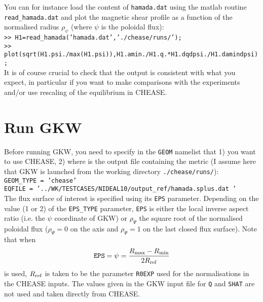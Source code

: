 \documentclass[a4paper,12pt]{article}
\newcommand{\ind}[1]{\ensuremath{_{\rm{#1}}}}
\begin{document}
You can for instance load the content of \texttt{hamada.dat} using the matlab routine \texttt{read\_hamada.dat} and plot the magnetic shear profile as a function of the normalised radius $\rho_\psi$ (where $\psi$ is the poloidal flux):\\
\texttt{\small >> H1=read\_hamada('hamada.dat','./chease/runs/');}\\
\texttt{\small >> plot(sqrt(H1.psi./max(H1.psi)),H1.amin./H1.q.*H1.dqdpsi./H1.damindpsi);}\\
It is of course crucial to check that the output is consistent with what you expect, in particular if you want to make comparisons with the experiments and/or use rescaling of the equilibrium in CHEASE.


\section{Run GKW}
Before running GKW, you need to specify in the \texttt{GEOM} namelist that 1) you want to use CHEASE, 2) where is the output file containing the metric (I assume here that GKW is launched from the working directory \texttt{./chease/runs/}):\\
\texttt{\small GEOM\_TYPE = 'chease'}\\
\texttt{\small EQFILE = '../WK/TESTCASES/NIDEAL10/output\_ref/hamada.splus.dat '}\\
The flux surface of interest is specified using its \texttt{EPS} parameter. Depending on the value (1 or 2) of the \texttt{EPS\_TYPE} parameter, \texttt{EPS} is either the local inverse aspect ratio (i.e. the $\psi$ coordinate of GKW) or $\rho_\Psi$ the square root of the normalised poloidal flux ($\rho_\Psi=0$ on the axis and $\rho_\Psi=1$ on the last closed flux surface).
Note that when 
$$\texttt{EPS}=\psi=\frac{R\ind{max}-R\ind{min}}{2R\ind{ref}}$$
is used, $R\ind{ref}$ is taken to be the parameter \texttt{R0EXP} used for the normalisations in the CHEASE inputs. The values given in the GKW input file for \texttt{Q} and \texttt{SHAT} are not used and taken directly from CHEASE.\\
\end{document}
